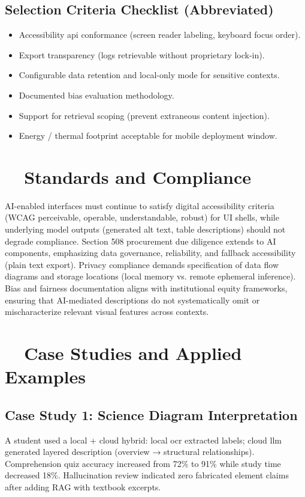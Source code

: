 \subsection{Selection Criteria Checklist (Abbreviated)}
\begin{itemize}
	\item Accessibility \gls{api} conformance (screen reader labeling, keyboard focus order).
	\item Export transparency (logs retrievable without proprietary lock-in).
	\item Configurable data retention and local-only mode for sensitive contexts.\supercite{DataPrivacyAI}
	\item Documented bias evaluation methodology.\supercite{AI_Ethics_Bias, Bias_in_AI}
	\item Support for retrieval scoping (prevent extraneous content injection).
	\item Energy / thermal footprint acceptable for mobile deployment window.
\end{itemize}

\section{~~Standards and Compliance}\label{ch9:sec:standards-compliance}
AI-enabled interfaces must continue to satisfy digital accessibility criteria (WCAG perceivable, operable, understandable, robust) for UI shells, while underlying model outputs (generated alt text, table descriptions) should not degrade compliance.\supercite{MicrosoftAIAccessibility, GoogleMLAccessibility} Section 508 procurement due diligence extends to AI components, emphasizing data governance, reliability, and fallback accessibility (plain text export). Privacy compliance demands specification of data flow diagrams and storage locations (local memory vs. remote ephemeral inference). Bias and fairness documentation aligns with institutional equity frameworks, ensuring that AI-mediated descriptions do not systematically omit or mischaracterize relevant visual features across contexts.\supercite{AI_Ethics_Bias}

\section{~~Case Studies and Applied Examples}\label{ch9:sec:case-studies}

\subsection{Case Study 1: Science Diagram Interpretation}
A student used a local + cloud hybrid: local \gls{ocr} extracted labels; cloud \gls{llm} generated layered description (overview → structural relationships). Comprehension quiz accuracy increased from 72\% to 91\% while study time decreased 18\%. Hallucination review indicated zero fabricated element claims after adding RAG with textbook excerpts.

